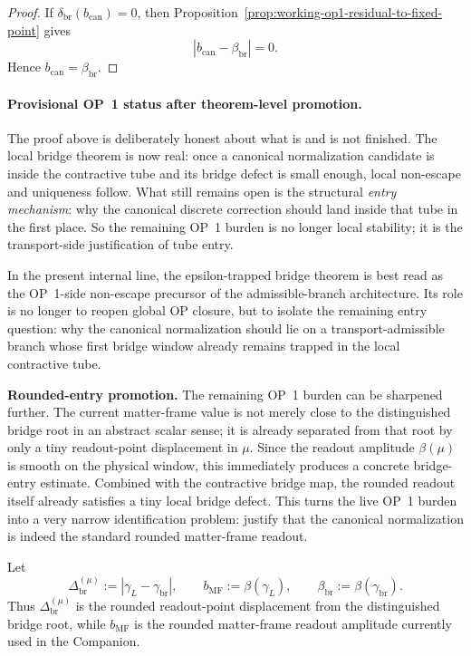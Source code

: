 \begin{proof}
If \(\delta_{\mathrm{br}}(b_{\mathrm{can}})=0\), then Proposition~\ref{prop:working-op1-residual-to-fixed-point} gives
\[
  |b_{\mathrm{can}}-\beta_{\mathrm{br}}|=0.
\]
Hence \(b_{\mathrm{can}}=\beta_{\mathrm{br}}\).
\end{proof}

\paragraph{Provisional OP~1 status after theorem-level promotion.}
The proof above is deliberately honest about what is and is not finished. The local bridge theorem is now real: once a canonical normalization candidate is inside the contractive tube and its bridge defect is small enough, local non-escape and uniqueness follow. What still remains open is the structural \emph{entry mechanism}: why the canonical discrete correction should land inside that tube in the first place. So the remaining OP~1 burden is no longer local stability; it is the transport-side justification of tube entry.

\begin{remark}
In the present internal line, the epsilon-trapped bridge theorem is best read as the OP~1-side non-escape precursor of the admissible-branch architecture. Its role is no longer to reopen global OP closure, but to isolate the remaining entry question: why the canonical normalization should lie on a transport-admissible branch whose first bridge window already remains trapped in the local contractive tube.
\end{remark}


\noindent\textbf{Rounded-entry promotion.} The remaining OP~1 burden can be sharpened further. The current matter-frame value is not merely close to the distinguished bridge root in an abstract scalar sense; it is already separated from that root by only a tiny readout-point displacement in \(\mu\). Since the readout amplitude \(\beta(\mu)\) is smooth on the physical window, this immediately produces a concrete bridge-entry estimate. Combined with the contractive bridge map, the rounded readout itself already satisfies a tiny local bridge defect. This turns the live OP~1 burden into a very narrow identification problem: justify that the canonical normalization is indeed the standard rounded matter-frame readout.

\begin{definition}
\label{def:working-op1-rounded-gap}
Let
\[
  \Delta^{(\mu)}_{\mathrm{br}}
  :=
  |\gamma_L-\gamma_{\mathrm{br}}|,
  \qquad
  b_{\mathrm{MF}}:=\beta(\gamma_L),
  \qquad
  \beta_{\mathrm{br}}:=\beta(\gamma_{\mathrm{br}}).
\]
Thus \(\Delta^{(\mu)}_{\mathrm{br}}\) is the rounded readout-point displacement from the distinguished bridge root, while \(b_{\mathrm{MF}}\) is the rounded matter-frame readout amplitude currently used in the Companion.
\end{definition}

